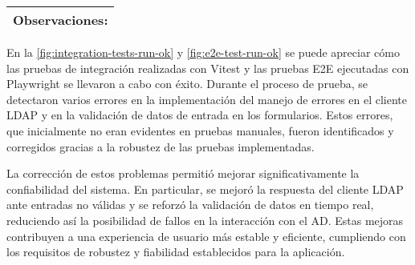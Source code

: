 \begin{longtable}{|p{2cm}|p{2.5cm}|p{2.5cm}|p{2.5cm}|p{2.5cm}|p{2.7cm}|}
    \multicolumn{6}{|l|}{\textbf{Observaciones}: }                                                                                                                                                                                                                                                                                                                                                                                                                                               \\ \hline
\end{longtable}


En la \autoref{fig:integration-tests-run-ok} y \autoref{fig:e2e-test-run-ok} se puede apreciar cómo las pruebas de integración realizadas con Vitest y las pruebas E2E ejecutadas con Playwright se llevaron a cabo con éxito. Durante el proceso de prueba, se detectaron varios errores en la implementación del manejo de errores en el cliente LDAP y en la validación de datos de entrada en los formularios. Estos errores, que inicialmente no eran evidentes en pruebas manuales, fueron identificados y corregidos gracias a la robustez de las pruebas implementadas.

La corrección de estos problemas permitió mejorar significativamente la confiabilidad del sistema. En particular, se mejoró la respuesta del cliente LDAP ante entradas no válidas y se reforzó la validación de datos en tiempo real, reduciendo así la posibilidad de fallos en la interacción con el AD. Estas mejoras contribuyen a una experiencia de usuario más estable y eficiente, cumpliendo con los requisitos de robustez y fiabilidad establecidos para la aplicación.
